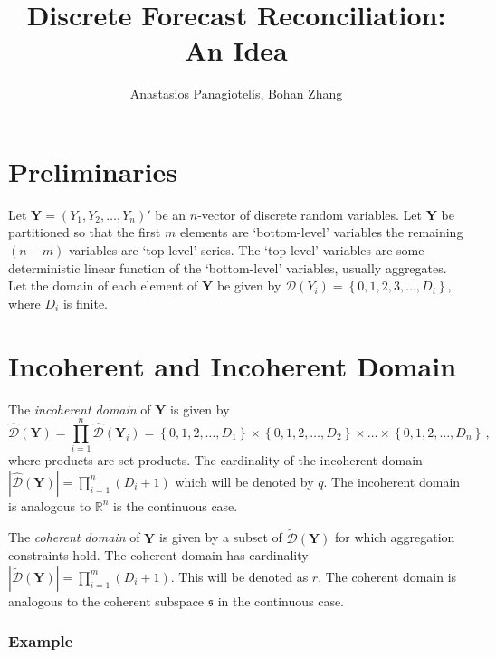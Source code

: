 \documentclass{article}
\title{Discrete Forecast Reconciliation: An Idea}
\author{Anastasios Panagiotelis, Bohan Zhang}
\newcommand{\bY}{\mathbf{Y}}
\begin{document}
	\maketitle
	\section{Preliminaries}
	Let $\bY=\left(Y_1,Y_2,\ldots,Y_n\right)'$ be an $n$-vector of discrete random variables. Let $\bY$ be partitioned so that the first $m$ elements are `bottom-level' variables the remaining $(n-m)$ variables are `top-level' series. The `top-level' variables are some deterministic linear function of the `bottom-level' variables, usually aggregates. Let the domain of each element of $\bY$ be given by $\mathcal{D}(Y_i)=\left\{0, 1,2,3,\dots,D_i\right\}$, where $D_i$ is finite.
	
	\section{Incoherent and Incoherent Domain}
	The \textit{incoherent domain} of $\bY$ is given by
	\[
	\hat{\mathcal D}(\bY)=\prod\limits_{i=1}^n\hat{\mathcal D}(\bY_i)=\left\{0, 1,2,\dots,D_1\right\}\times\left\{0,1,2,\dots,D_2\right\}\times\dots\times\left\{0,1,2,\dots,D_n\right\}\,,
	\] 
    where products are set products. The cardinality of the incoherent domain $|\hat{\mathcal D}(\bY)|=\prod\limits_{i=1}^{n} (D_i+1)$ which will be denoted by $q$. The incoherent domain is analogous to $\mathbb{R}^n$ is the continuous case.
    
    The \textit{coherent domain} of $\bY$ is given by a subset of $\tilde{\mathcal D}(\bY)$ for which aggregation constraints hold.  The coherent domain has cardinality $|\tilde{\mathcal D}(\bY)|=\prod\limits_{i=1}^{m} (D_i+1)$. This will be denoted as $r$.  The coherent domain is analogous to the coherent subspace $\mathfrak{s}$ in the continuous case.
    
    \subsubsection*{Example}
    
\end{document}
